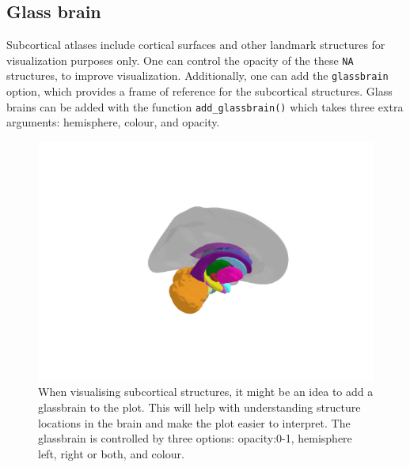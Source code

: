 \documentclass[fleqn,10pt]{wlpeerj} %
\newenvironment{Shaded}{\begin{snugshade}}{\end{snugshade}}
\newcommand{\CommentTok}[1]{\textcolor[rgb]{0.56,0.35,0.01}{\textit{#1}}}
\newcommand{\DataTypeTok}[1]{\textcolor[rgb]{0.13,0.29,0.53}{#1}}
\newcommand{\FloatTok}[1]{\textcolor[rgb]{0.00,0.00,0.81}{#1}}
\newcommand{\KeywordTok}[1]{\textcolor[rgb]{0.13,0.29,0.53}{\textbf{#1}}}
\newcommand{\NormalTok}[1]{#1}
\newcommand{\OperatorTok}[1]{\textcolor[rgb]{0.81,0.36,0.00}{\textbf{#1}}}
\newcommand{\StringTok}[1]{\textcolor[rgb]{0.31,0.60,0.02}{#1}}
\begin{document}
\hypertarget{glass-brain}{%
\subsection{Glass brain}\label{glass-brain}}

Subcortical atlases include cortical surfaces and other landmark structures for visualization purposes only.
One can control the opacity of the these \texttt{NA} structures, to improve visualization.
Additionally, one can add the \texttt{glassbrain} option, which provides a frame of reference for the subcortical structures.
Glass brains can be added with the function \texttt{add\_glassbrain()} which takes three extra arguments: hemisphere, colour, and opacity.

\begin{Shaded}
\end{Shaded}

\begin{figure}
\includegraphics[width=0.6\linewidth]{png/ggseg3d_glass} \caption{When visualising subcortical structures, it might be an idea to add a glassbrain to the plot. This will help with understanding structure locations in the brain and make the plot easier to interpret. The glassbrain is controlled by three options: opacity:0-1, hemisphere left, right or both, and colour.}\label{fig:glassbrain1}
\end{figure}
\end{document}
